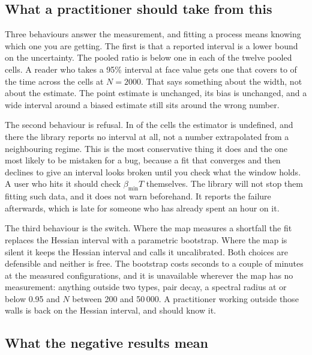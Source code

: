 \subsection{What a practitioner should take from this}

Three behaviours answer the measurement, and fitting a process means knowing which
one you are getting. The first is that a reported interval is a lower bound on the
uncertainty. The pooled ratio is below one in each of the twelve pooled cells. A
reader who takes a 95\% interval at face value gets one that covers
\ThCovSmallLow{} to \ThCovSmallHigh{} of the time across the cells at $N = 2000$.
That says something about the width, not about the estimate. The point estimate is
unchanged, its bias is unchanged, and a wide interval around a biased estimate still
sits around the wrong number.

The second behaviour is refusal. In \HsixUndefined{} of the \HsixCells{} cells the
estimator is undefined, and there the library reports no interval at all, not a
number extrapolated from a neighbouring regime. This is the most conservative thing
it does and the one most likely to be mistaken for a bug, because a fit that
converges and then declines to give an interval looks broken until you check what
the window holds. A user who hits it should check $\beta_{\min} T$ themselves. The
library will not stop them fitting such data, and it does not warn beforehand. It
reports the failure afterwards, which is late for someone who has already spent an
hour on it.

The third behaviour is the switch. Where the map measures a shortfall the fit
replaces the Hessian interval with a parametric bootstrap. Where the map is silent
it keeps the Hessian interval and calls it uncalibrated. Both choices are defensible
and neither is free. The bootstrap costs seconds to a couple of minutes at the
measured configurations, and it is unavailable wherever the map has no measurement:
anything outside two types, pair decay, a spectral radius at or below 0.95 and $N$
between 200 and 50\,000. A practitioner working outside those walls is back on the
Hessian interval, and should know it.

\subsection{What the negative results mean}

